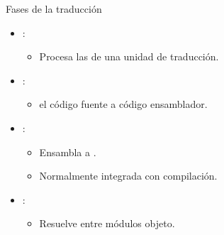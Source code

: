 \begin{frame}[t]{Fases de la traducción}
\begin{itemize}
  \item {}:
    \begin{itemize}
      \item Procesa las  de una unidad de traducción.
    \end{itemize}

  \item {}:
    \begin{itemize}
      \item {} el código fuente a código ensamblador.
    \end{itemize}

  \item {}:
    \begin{itemize}
      \item Ensambla a .
      \item Normalmente integrada con compilación.
    \end{itemize}

  \item {}:
    \begin{itemize}
      \item Resuelve  entre módulos objeto.
    \end{itemize}
\end{itemize}
\end{frame}

